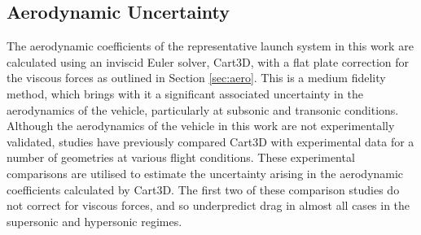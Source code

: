 \subsection{Aerodynamic Uncertainty}\label{sec:aerouncsub}



The aerodynamic coefficients of the representative launch system in this work are calculated using an inviscid Euler solver, Cart3D, with a flat plate correction for the viscous forces as outlined in Section \ref{sec:aero}. This is a medium fidelity method, which brings with it a significant associated uncertainty in the aerodynamics of the vehicle, particularly at subsonic and transonic conditions. Although the aerodynamics of the vehicle in this work are not experimentally validated, studies have previously compared Cart3D with experimental data for a number of geometries at various flight conditions. These experimental comparisons are utilised to estimate the uncertainty arising in the aerodynamic coefficients calculated by Cart3D. The first two of these comparison studies do not correct for viscous forces, and so underpredict drag in almost all cases in the supersonic and hypersonic regimes.




